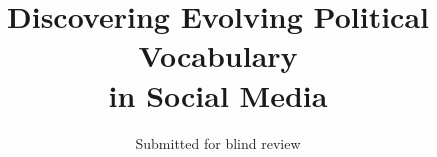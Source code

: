 \documentclass[conference]{IEEEtran}
\newcommand{\reviews}[1]{[{\color{magenta}\textit{reviews}\textit{: #1}}]}
\newcommand{\TODO}[2]{{\color{red}[\textbf{TODO:} #2 \textbf{Assignee:} #1]}}
\begin{document}

\title{Discovering Evolving Political Vocabulary \\ in Social Media}
\author{Submitted for blind review}

\maketitle
\end{document}
